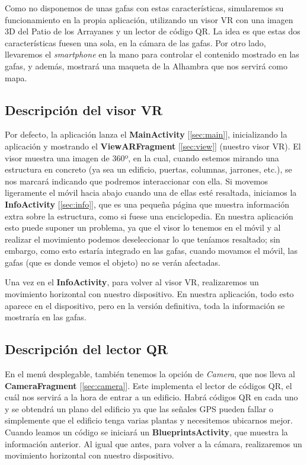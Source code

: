 \documentclass[11pt,a4paper]{article}
\begin{document}
Como no disponemos de unas gafas con estas características, simularemos su funcionamiento en la propia aplicación, utilizando un visor
VR con una imagen 3D del Patio de los Arrayanes y un lector de código QR. La idea es que estas dos características fuesen una sola, en
la cámara de las gafas. Por otro lado, llevaremos el \textit{smartphone} en la mano para controlar el contenido mostrado en las gafas, y
además, mostrará una maqueta de la Alhambra que nos servirá como mapa.

\subsection{Descripción del visor VR}
\label{sec:vr}

Por defecto, la aplicación lanza el \textbf{MainActivity} [\ref{sec:main}], inicializando la aplicación y mostrando el \textbf{ViewARFragment}
[\ref{sec:view}] (nuestro visor VR). El visor muestra una imagen de 360º, en la cual, cuando estemos mirando una estructura en concreto
(ya sea un edificio, puertas, columnas, jarrones, etc.), se nos marcará indicando que podremos interaccionar con ella.
Si movemos ligeramente el móvil hacia abajo cuando una de ellas esté resaltada, iniciamos la \textbf{InfoActivity} [\ref{sec:info}],
que es una pequeña página que muestra información extra sobre la estructura, como si fuese una enciclopedia. En nuestra aplicación esto
puede suponer un problema, ya que el visor lo tenemos en el móvil y al realizar el movimiento podemos deseleccionar lo que teníamos
resaltado; sin embargo, como esto estaría integrado en las gafas, cuando movamos el móvil, las gafas (que es donde vemos el objeto) no
se verán afectadas.

Una vez en el \textbf{InfoActivity}, para volver al visor VR, realizaremos un movimiento horizontal con nuestro dispositivo.
En nuestra aplicación, todo esto aparece en el dispositivo, pero en la versión definitiva, toda la información se mostraría en
las gafas.

\subsection{Descripción del lector QR}

En el menú desplegable, también tenemos la opción de \textit{Camera}, que nos lleva al \textbf{CameraFragment} [\ref{sec:camera}]. Este
implementa el lector de códigos QR, el cuál nos servirá a la hora de entrar a un edificio. Habrá códigos QR en cada uno y se obtendrá un
plano del edificio ya que las señales GPS pueden fallar o simplemente que el edificio tenga varias plantas y necesitemos ubicarnos mejor.
Cuando leamos un código se iniciará un \textbf{BlueprintsActivity}, que muestra la información anterior. Al igual que antes, para
volver a la cámara, realizaremos un movimiento horizontal con nuestro dispositivo.
\end{document}
